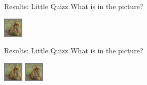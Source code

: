 \documentclass[10pt]{beamer}
\begin{document}
  \begin{frame}{Results: Little Quizz}
    What is in the picture?
    \begin{center}
      \includegraphics[width=0.5\linewidth]{./img/lion_512B.png}
    \end{center}
  \end{frame}
  \begin{frame}{Results: Little Quizz}
    What is in the picture?
    \begin{center}
      \includegraphics[width=0.5\linewidth]{./img/lion_512B.png}
      \includegraphics[width=0.5\linewidth]{./img/lion.png}
    \end{center}
    \vspace{5mm}
    \begin{figure}
      \begin{minipage}{\textwidth}
               \\
      \end{minipage}
  \end{figure}
  \end{frame}
\end{document}

